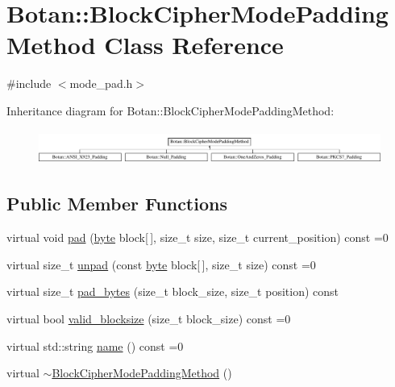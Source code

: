 \hypertarget{classBotan_1_1BlockCipherModePaddingMethod}{\section{Botan\-:\-:Block\-Cipher\-Mode\-Padding\-Method Class Reference}
\label{classBotan_1_1BlockCipherModePaddingMethod}
}


{\ttfamily \#include $<$mode\-\_\-pad.\-h$>$}

Inheritance diagram for Botan\-:\-:Block\-Cipher\-Mode\-Padding\-Method\-:\begin{figure}[H]
\begin{center}
\leavevmode
\includegraphics[height=1.133603cm]{classBotan_1_1BlockCipherModePaddingMethod}
\end{center}
\end{figure}
\subsection*{Public Member Functions}
\begin{DoxyCompactItemize}
\item 
virtual void \hyperlink{classBotan_1_1BlockCipherModePaddingMethod_a75f5e0766e4b8489ca1ac652a3adc737}{pad} (\hyperlink{namespaceBotan_a7d793989d801281df48c6b19616b8b84}{byte} block\mbox{[}$\,$\mbox{]}, size\-\_\-t size, size\-\_\-t current\-\_\-position) const =0
\item 
virtual size\-\_\-t \hyperlink{classBotan_1_1BlockCipherModePaddingMethod_a122aa6c16ca4ce44667f7d6b8141fa73}{unpad} (const \hyperlink{namespaceBotan_a7d793989d801281df48c6b19616b8b84}{byte} block\mbox{[}$\,$\mbox{]}, size\-\_\-t size) const =0
\item 
virtual size\-\_\-t \hyperlink{classBotan_1_1BlockCipherModePaddingMethod_a67570b4fa5007e9448a6b835b59852ea}{pad\-\_\-bytes} (size\-\_\-t block\-\_\-size, size\-\_\-t position) const 
\item 
virtual bool \hyperlink{classBotan_1_1BlockCipherModePaddingMethod_a49f6743ae35a39d462de148c05202227}{valid\-\_\-blocksize} (size\-\_\-t block\-\_\-size) const =0
\item 
virtual std\-::string \hyperlink{classBotan_1_1BlockCipherModePaddingMethod_a02d1dd1cbc869bf78e241c5c7613e4a7}{name} () const =0
\item 
virtual \hyperlink{classBotan_1_1BlockCipherModePaddingMethod_a51e958cdcf0c6fef45e16043dc688bd8}{$\sim$\-Block\-Cipher\-Mode\-Padding\-Method} ()
\end{DoxyCompactItemize}


